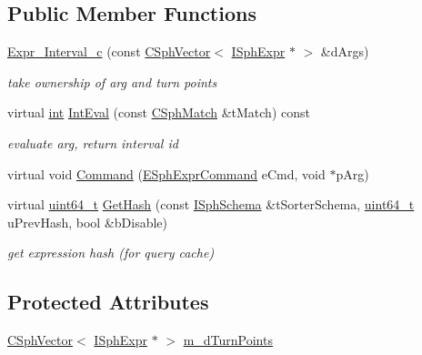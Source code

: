 \subsection*{Public Member Functions}
\begin{DoxyCompactItemize}
\item 
\hyperlink{classExpr__Interval__c_afdd2a879a0163df7c08b3c7de47c9c3a}{Expr\-\_\-\-Interval\-\_\-c} (const \hyperlink{classCSphVector}{C\-Sph\-Vector}$<$ \hyperlink{structISphExpr}{I\-Sph\-Expr} $\ast$ $>$ \&d\-Args)
\begin{DoxyCompactList}\small\item\em take ownership of arg and turn points \end{DoxyCompactList}\item 
virtual \hyperlink{sphinxexpr_8cpp_a4a26e8f9cb8b736e0c4cbf4d16de985e}{int} \hyperlink{classExpr__Interval__c_a27b92e95e340908a74d5d5ab641bb331}{Int\-Eval} (const \hyperlink{classCSphMatch}{C\-Sph\-Match} \&t\-Match) const 
\begin{DoxyCompactList}\small\item\em evaluate arg, return interval id \end{DoxyCompactList}\item 
virtual void \hyperlink{classExpr__Interval__c_a84ded4e897c046d2ea7caa08c5b411ca}{Command} (\hyperlink{sphinxexpr_8h_a30be184fb07bd80c271360fc6094c818}{E\-Sph\-Expr\-Command} e\-Cmd, void $\ast$p\-Arg)
\item 
virtual \hyperlink{sphinxstd_8h_aaa5d1cd013383c889537491c3cfd9aad}{uint64\-\_\-t} \hyperlink{classExpr__Interval__c_ad45d2ec2a0ff4e7a82657592deee2ac1}{Get\-Hash} (const \hyperlink{classISphSchema}{I\-Sph\-Schema} \&t\-Sorter\-Schema, \hyperlink{sphinxstd_8h_aaa5d1cd013383c889537491c3cfd9aad}{uint64\-\_\-t} u\-Prev\-Hash, bool \&b\-Disable)
\begin{DoxyCompactList}\small\item\em get expression hash (for query cache) \end{DoxyCompactList}\end{DoxyCompactItemize}
\subsection*{Protected Attributes}
\begin{DoxyCompactItemize}
\item 
\hyperlink{classCSphVector}{C\-Sph\-Vector}$<$ \hyperlink{structISphExpr}{I\-Sph\-Expr} $\ast$ $>$ \hyperlink{classExpr__Interval__c_a8cf3e04bb243699df03f713697f1b7e1}{m\-\_\-d\-Turn\-Points}
\end{DoxyCompactItemize}
